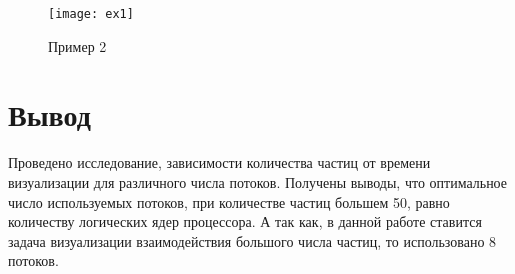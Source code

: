 \begin{figure}[H]
	\centering
	\texttt{[image: ex1]}
	\caption{Пример 2}
	\label{img:ex2}
\end{figure}

\section{\textbf{Вывод}}

Проведено исследование, зависимости количества частиц от времени визуализации для различного числа потоков. Получены выводы, что оптимальное число используемых потоков, при количестве частиц большем 50, равно количеству логических ядер процессора. А так как, в данной работе ставится задача визуализации взаимодействия большого числа частиц, то использовано 8 потоков. 